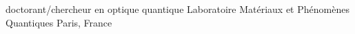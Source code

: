     {doctorant/chercheur en optique quantique}
    {Laboratoire Matériaux et Phénomènes Quantiques}
    {Paris, France}


\myProExperienceDetailsSeparator


\myProExperienceDetailsSeparator


\myProExperienceDetailsSeparator

